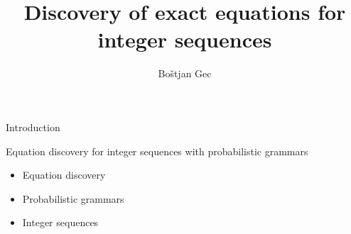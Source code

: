\documentclass[t,usenames,dvipsnames]{beamer} %
\title{Discovery of exact equations for integer sequences}
\author{Boštjan Gec}
\institute{mentor: prof. dr. Ljupčo Todorovski}
\newcommand{\1}{\boldsymbol{1}}
\newcommand{\0}{\boldsymbol{0}}
\begin{document}
\begin{frame}
  \maketitle
\end{frame}



\begin{frame}{Introduction}
\begin{block}{Equation discovery for integer sequences with probabilistic grammars}
\begin{itemize}
	\item Equation discovery
	\item Probabilistic grammars
	\item Integer sequences
\end{itemize}
\end{block}
\end{frame}



     
\end{document}
